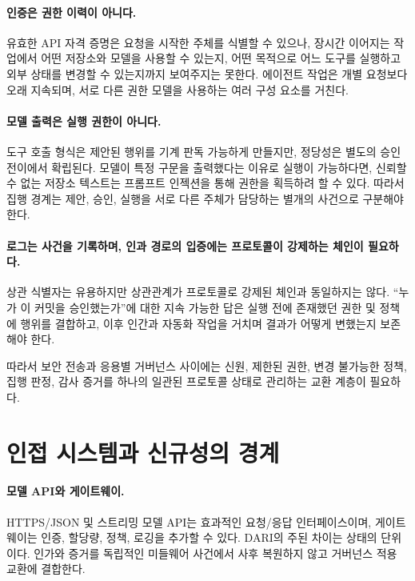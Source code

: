\documentclass[10pt]{article}
\newcommand{\dariname}{DARI}
\begin{document}
\paragraph{인증은 권한 이력이 아니다.}
유효한 API 자격 증명은 요청을 시작한 주체를 식별할 수 있으나, 장시간 이어지는 작업에서 어떤 저장소와 모델을 사용할 수 있는지, 어떤 목적으로 어느 도구를 실행하고 외부 상태를 변경할 수 있는지까지 보여주지는 못한다. 에이전트 작업은 개별 요청보다 오래 지속되며, 서로 다른 권한 모델을 사용하는 여러 구성 요소를 거친다.

\paragraph{모델 출력은 실행 권한이 아니다.}
도구 호출 형식은 제안된 행위를 기계 판독 가능하게 만들지만, 정당성은 별도의 승인 전이에서 확립된다. 모델이 특정 구문을 출력했다는 이유로 실행이 가능하다면, 신뢰할 수 없는 저장소 텍스트는 프롬프트 인젝션을 통해 권한을 획득하려 할 수 있다. 따라서 집행 경계는 제안, 승인, 실행을 서로 다른 주체가 담당하는 별개의 사건으로 구분해야 한다.

\paragraph{로그는 사건을 기록하며, 인과 경로의 입증에는 프로토콜이 강제하는 체인이 필요하다.}
상관 식별자는 유용하지만 상관관계가 프로토콜로 강제된 체인과 동일하지는 않다. ``누가 이 커밋을 승인했는가''에 대한 지속 가능한 답은 실행 전에 존재했던 권한 및 정책에 행위를 결합하고, 이후 인간과 자동화 작업을 거치며 결과가 어떻게 변했는지 보존해야 한다.

따라서 보안 전송과 응용별 거버넌스 사이에는 신원, 제한된 권한, 변경 불가능한 정책, 집행 판정, 감사 증거를 하나의 일관된 프로토콜 상태로 관리하는 교환 계층이 필요하다.

\section{인접 시스템과 신규성의 경계}

\paragraph{모델 API와 게이트웨이.}
HTTPS/JSON 및 스트리밍 모델 API는 효과적인 요청/응답 인터페이스이며, 게이트웨이는 인증, 할당량, 정책, 로깅을 추가할 수 있다. \dariname{}의 주된 차이는 상태의 단위이다. 인가와 증거를 독립적인 미들웨어 사건에서 사후 복원하지 않고 거버넌스 적용 교환에 결합한다.
\end{document}
